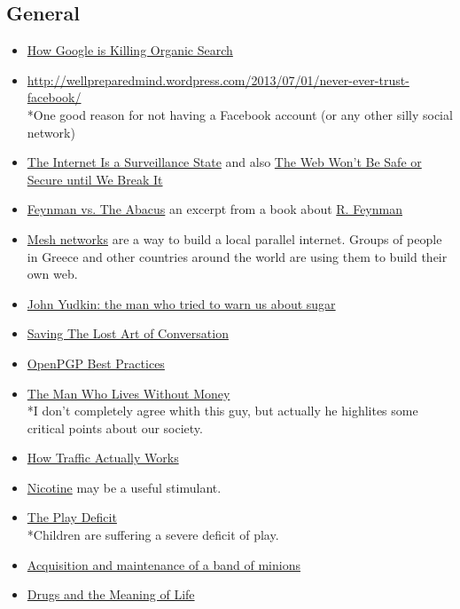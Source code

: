 \documentclass{article}
\begin{document}
\subsection{General}
\begin{itemize}
	\item \href{http://blog.tutorspree.com/post/54349646327/death-of-organic-search}{How Google is Killing Organic Search}
	\item \url{http://wellpreparedmind.wordpress.com/2013/07/01/never-ever-trust-facebook/}
	\\*One good reason for not having a Facebook account (or any other silly social network) 
	\item \href{http://www.schneier.com/essay-418.html}{The Internet Is a Surveillance State}
	and also \href{http://queue.acm.org/detail.cfm?id=2390758}{The Web Won't Be Safe or Secure until We Break It}
	\item \href{http://www.ee.ryerson.ca/~elf/abacus/feynman.html}{Feynman vs. The Abacus} an excerpt from a book about \href{http://en.wikipedia.org/wiki/Richard_Feynman}{R. Feynman}
      \item \href{http://www.motherjones.com/politics/2013/08/mesh-internet-privacy-nsa-isp}{Mesh networks} are a way to build a local parallel internet. Groups of people in Greece and other countries around the world are using them to build their own web.
      \item \href{http://www.telegraph.co.uk/health/dietandfitness/10634081/John-Yudkin-the-man-who-tried-to-warn-us-about-sugar.html}{John Yudkin: the man who tried to warn us about sugar}
      \item \href{http://www.theatlantic.com/magazine/archive/2014/01/the-eavesdropper/355727/}{Saving The Lost Art of Conversation}
      \item \href{https://we.riseup.net/riseuplabs+paow/openpgp-best-practices}{OpenPGP Best Practices}
      \item \href{http://www.trueactivist.com/the-man-who-lives-without-money/}{The Man Who Lives Without Money}
      \\*I don't completely agree whith this guy, but actually he highlites some critical points about our society.
      \item \href{http://jliszka.github.io/2013/10/01/how-traffic-actually-works.html}{How Traffic Actually Works}
      \item \href{http://www.gwern.net/Nicotine}{Nicotine} may be a useful stimulant.
      \item \href{http://aeon.co/magazine/being-human/children-today-are-suffering-a-severe-deficit-of-play/}{The Play Deficit}
      \\*Children are suffering a severe deficit of play.
      \item \href{http://rachelbythebay.com/w/2013/06/15/campus/}{Acquisition and maintenance of a band of minions}
      \item \href{http://www.samharris.org/blog/item/drugs-and-the-meaning-of-life}{Drugs and the Meaning of Life}
\end{itemize}
\end{document}
